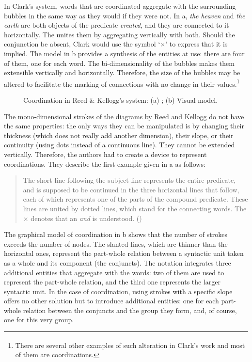 \documentclass[output=paper]{langsci/langscibook}
\begin{document}
In Clark’s system, words that are coordinated aggregate with the surrounding bubbles in the same way as they would if they were not. In a, \textit{the heaven} and \textit{the earth} are both objects of the predicate \textit{created}, and they are connected to it horizontally. The  unites them by aggregating vertically with both. Should the conjunction be absent, Clark would use the symbol ‘×’ to express that it is implied. The model in b provides a synthesis of the entities at use: there are four of them, one for each word. The bi-dimensionality of the bubbles makes them extensible vertically and horizontally. Therefore, the size of the bubbles may be altered to facilitate the marking of connections with no change in their values.\footnote{\textrm{\textsuperscript{} }\textrm{There are several other examples of such alteration in Clark’s work and most of them are coordinations.} } 


\begin{figure}
    \caption{Coordination in Reed \& Kellogg’s system: (a) \citeyear[48]{reed_graded_1879}; (b) Visual model.\label{fig:4:8}}    
\end{figure}


The mono-dimensional strokes of the diagrams by Reed and Kellogg do not have the same properties: the only ways they can be manipulated is by changing their thickness (which does not really add another dimension), their slope, or their continuity (using dots instead of a continuous line). They cannot be extended vertically. Therefore, the authors had to create a device to represent coordinations. They describe the first example given in a as follows:

\begin{quote}
The short line following the subject line represents the entire predicate, and is supposed to be continued in the three horizontal lines that follow, each of which represents one of the parts of the compound predicate. These lines are united by dotted lines, which stand for the connecting words. The × denotes that an \textit{and} is understood. (\citealt[47--48]{reed_graded_1879})
\end{quote}

The graphical model of coordination in b shows that the number of strokes exceeds the number of nodes. The slanted lines, which are thinner than the horizontal ones, represent the part-whole relation between a syntactic unit taken as a whole and its component (the conjuncts). The notation integrates three additional entities that aggregate with the words: two of them are used to represent the part-whole relation, and the third one represents the larger syntactic unit. In the case of coordination, using strokes with a specific slope offers no other solution but to introduce additional entities: one for each part-whole relation between the conjuncts and the group they form, and, of course, one for this very group.
\end{document}
